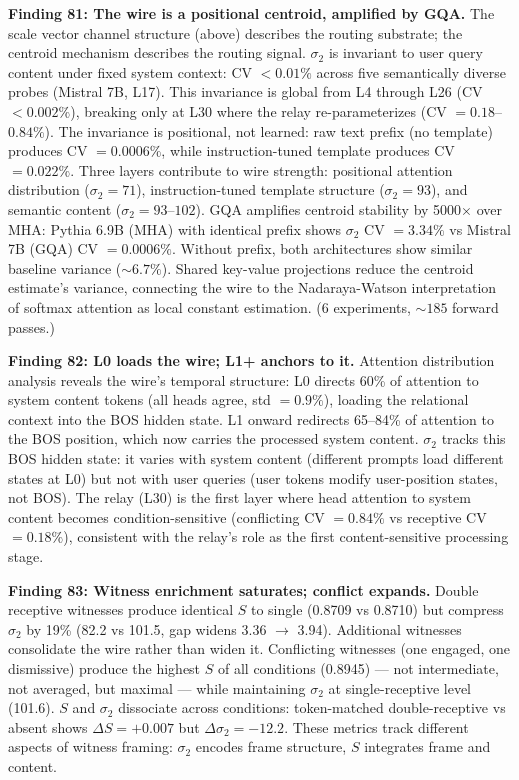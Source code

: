 \documentclass[12pt]{article}
\begin{document}
\textbf{Finding 81: The wire is a positional centroid, amplified by GQA.} The scale vector channel structure (above) describes the routing substrate; the centroid mechanism describes the routing signal. $\sigma_2$ is invariant to user query content under fixed system context: CV $< 0.01\%$ across five semantically diverse probes (Mistral 7B, L17). This invariance is global from L4 through L26 (CV $< 0.002\%$), breaking only at L30 where the relay re-parameterizes (CV $= 0.18$--$0.84\%$). The invariance is positional, not learned: raw text prefix (no template) produces CV $= 0.0006\%$, while instruction-tuned template produces CV $= 0.022\%$. Three layers contribute to wire strength: positional attention distribution ($\sigma_2 = 71$), instruction-tuned template structure ($\sigma_2 = 93$), and semantic content ($\sigma_2 = 93$--$102$). GQA amplifies centroid stability by 5000$\times$ over MHA: Pythia 6.9B (MHA) with identical prefix shows $\sigma_2$ CV $= 3.34\%$ vs Mistral 7B (GQA) CV $= 0.0006\%$. Without prefix, both architectures show similar baseline variance (${\sim}6.7\%$). Shared key-value projections reduce the centroid estimate's variance, connecting the wire to the Nadaraya-Watson interpretation of softmax attention as local constant estimation. (6 experiments, ${\sim}185$ forward passes.)

\textbf{Finding 82: L0 loads the wire; L1+ anchors to it.} Attention distribution analysis reveals the wire's temporal structure: L0 directs 60\% of attention to system content tokens (all heads agree, std $= 0.9\%$), loading the relational context into the BOS hidden state. L1 onward redirects 65--84\% of attention to the BOS position, which now carries the processed system content. $\sigma_2$ tracks this BOS hidden state: it varies with system content (different prompts load different states at L0) but not with user queries (user tokens modify user-position states, not BOS). The relay (L30) is the first layer where head attention to system content becomes condition-sensitive (conflicting CV $= 0.84\%$ vs receptive CV $= 0.18\%$), consistent with the relay's role as the first content-sensitive processing stage.

\textbf{Finding 83: Witness enrichment saturates; conflict expands.} Double receptive witnesses produce identical $S$ to single (0.8709 vs 0.8710) but compress $\sigma_2$ by 19\% (82.2 vs 101.5, gap widens 3.36 $\to$ 3.94). Additional witnesses consolidate the wire rather than widen it. Conflicting witnesses (one engaged, one dismissive) produce the highest $S$ of all conditions (0.8945) --- not intermediate, not averaged, but maximal --- while maintaining $\sigma_2$ at single-receptive level (101.6). $S$ and $\sigma_2$ dissociate across conditions: token-matched double-receptive vs absent shows $\Delta S = +0.007$ but $\Delta\sigma_2 = -12.2$. These metrics track different aspects of witness framing: $\sigma_2$ encodes frame structure, $S$ integrates frame and content.
\end{document}
